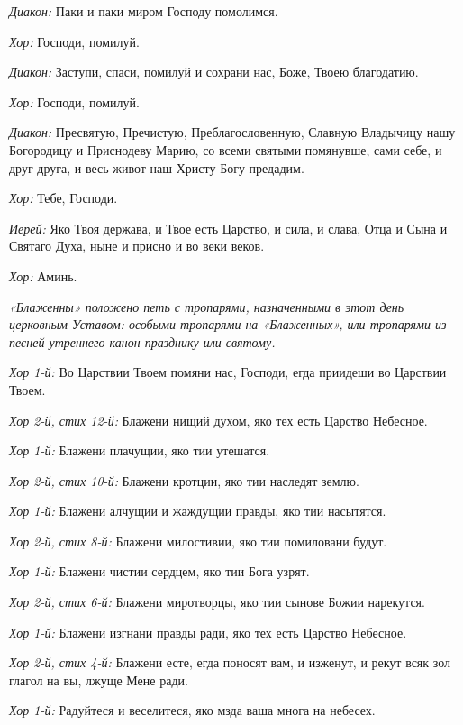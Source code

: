 \begin{mymulticols}


{\itshape Диакон:} Паки и паки миром Господу помолимся. 


{\itshape Хор:} Господи, помилуй. 


{\itshape Диакон:} Заступи, спаси, помилуй и сохрани нас, Боже, Твоею благодатию. 


{\itshape Хор:} Господи, помилуй. 


{\itshape Диакон:} Пресвятую, Пречистую, Преблагословенную, Славную Владычицу нашу Богородицу и Приснодеву Марию, со всеми святыми помянувше, сами себе, и друг друга, и весь живот наш Христу Богу предадим.


{\itshape Хор:} Тебе, Господи. 


{\itshape Иерей:} Яко Твоя держава, и Твое есть Царство, и сила, и слава, Отца и Сына и Святаго Духа, ныне и присно и во веки веков. 


{\itshape Хор:} Аминь.




{\itshape «Блаженны» положено петь с тропарями, назначенными в этот день церковным Уставом: особыми тропарями на «Блаженных», или тропарями из песней утреннего канон празднику или святому.}


{\itshape Хор 1-й:} Во Царствии Твоем помяни нас, Господи, егда приидеши во Царствии Твоем. 

{\itshape Хор 2-й, стих 12-й:} Блажени нищий духом, яко тех есть Царство Небесное. 


{\itshape Хор 1-й:} Блажени плачущии, яко тии утешатся.


{\itshape Хор 2-й, стих 10-й:} Блажени кротции, яко тии наследят землю. 


{\itshape Хор 1-й:} Блажени алчущии и жаждущии правды, яко тии насытятся.


{\itshape Хор 2-й, стих 8-й:} Блажени милостивии, яко тии помиловани будут. 


{\itshape Хор 1-й:} Блажени чистии сердцем, яко тии Бога узрят.


{\itshape Хор 2-й, стих 6-й:} Блажени миротворцы, яко тии сынове Божии нарекутся. 


{\itshape Хор 1-й:} Блажени изгнани правды ради, яко тех есть Царство Небесное.


{\itshape Хор 2-й, стих 4-й:} Блажени есте, егда поносят вам, и изженут, и рекут всяк зол глагол на вы, лжуще Мене ради. 


{\itshape Хор 1-й:} Радуйтеся и веселитеся, яко мзда ваша многа на небесех. 



\end{mymulticols}
